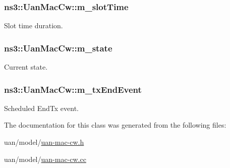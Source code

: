 \subsubsection[{\texorpdfstring{m\+\_\+slot\+Time}{m_slotTime}}]{ ns3\+::\+Uan\+Mac\+Cw\+::m\+\_\+slot\+Time\hspace{0.3cm}{\ttfamily [private]}}\hypertarget{classns3_1_1UanMacCw_a8fa0ad746b687dda61ccfa3f5bab975b}{}\label{classns3_1_1UanMacCw_a8fa0ad746b687dda61ccfa3f5bab975b}


Slot time duration. 

\subsubsection[{\texorpdfstring{m\+\_\+state}{m_state}}]{ ns3\+::\+Uan\+Mac\+Cw\+::m\+\_\+state\hspace{0.3cm}{\ttfamily [private]}}\hypertarget{classns3_1_1UanMacCw_a577ccecc9cde62c54f3dd37f60ac5165}{}\label{classns3_1_1UanMacCw_a577ccecc9cde62c54f3dd37f60ac5165}
Current state. 
\subsubsection[{\texorpdfstring{m\+\_\+tx\+End\+Event}{m_txEndEvent}}]{ ns3\+::\+Uan\+Mac\+Cw\+::m\+\_\+tx\+End\+Event\hspace{0.3cm}{\ttfamily [private]}}\hypertarget{classns3_1_1UanMacCw_a5f78b44fb27bb8f0cdc701bca775f981}{}\label{classns3_1_1UanMacCw_a5f78b44fb27bb8f0cdc701bca775f981}
Scheduled End\+Tx event. 

The documentation for this class was generated from the following files\+:\begin{DoxyCompactItemize}
\item 
uan/model/\hyperlink{uan-mac-cw_8h}{uan-\/mac-\/cw.\+h}\item 
uan/model/\hyperlink{uan-mac-cw_8cc}{uan-\/mac-\/cw.\+cc}\end{DoxyCompactItemize}
